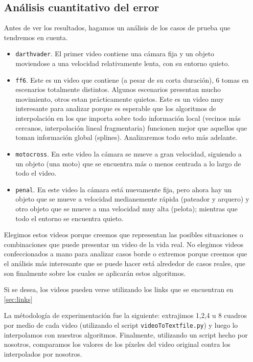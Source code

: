 \subsection{Análisis cuantitativo del error}

Antes de ver los resultados, hagamos un análisis de los casos de prueba que tendremos en cuenta.

\begin{itemize}
    \item \texttt{darthvader}. El primer video contiene una cámara fija y un objeto moviendose a una velocidad relativamente lenta, con su entorno quieto. 
    \item \texttt{ff6}. Este es un video que contiene (a pesar de su corta duración), 6 tomas en escenarios totalmente distintos. Algunos escenarios presentan mucho movimiento, otros estan prácticamente quietos. Este es un video muy interesante para analizar porque es esperable que los algoritmos de interpolación en los que importa sobre todo información local (vecinos más cercanos, interpolación lineal fragmentaria) funcionen mejor que aquellos que toman información global (splines). Analizaremos todo esto más adelante. 
    \item \texttt{motocross}. En este video la cámara se mueve a gran velocidad, siguiendo a un objeto (una moto) que se encuentra más o menos centrada a lo largo de todo el video. 
    \item \texttt{penal}. En este video la cámara está nuevamente fija, pero ahora hay un objeto que se mueve a velocidad medianemente rápida (pateador y arquero) y otro objeto que se mueve a una velocidad muy alta (pelota); mientras que todo el entorno se encuentra quieto. 
\end{itemize}

Elegimos estos videos porque creemos que representan las posibles situaciones o combinaciones que puede presentar un video de la vida real. No elegimos videos confeccionados a mano para analizar casos borde o extremos porque creemos que el análisis más interesante que se puede hacer está alrededor de casos reales, que son finalmente sobre los cuales se aplicarán estos algoritmos.

Si se desea, los videos pueden verse utilizando los links que se encuentran en \ref{sec:links}

La métodología de experimentación fue la siguiente: extrajimos 1,2,4 u 8 cuadros por medio de cada video (utilizando el script \texttt{videoToTextfile.py}) y luego lo interpolamos con nuestros algoritmos. Finalmente, utilizando un script hecho por nosotros, comparamos los valores de los píxeles del video original contra los interpolados por nosotros. 

